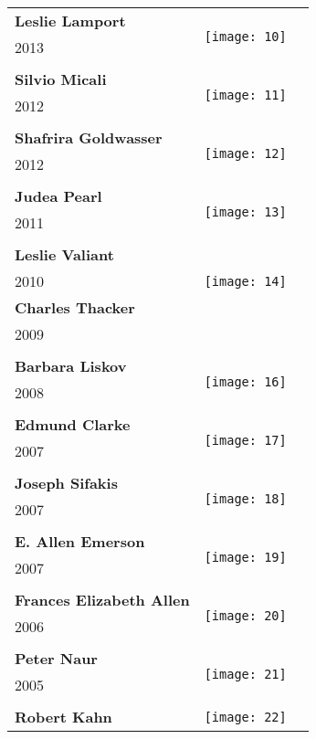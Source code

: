 \documentclass[12pt]{article}
\begin{document}
\begin{center}
\begin{longtable}{| p{} | p{} | p{20cm}}
\hline
\textbf{Leslie Lamport } &  \multirow{3}{4em}{\texttt{[image: 10]}} \\ 
2013&   \\ 
&\\
\hline
\textbf{Silvio Micali } &  \multirow{3}{4em}{\texttt{[image: 11]}} \\ 
2012&   \\ 
&\\
\hline
\textbf{Shafrira Goldwasser } &  \multirow{3}{4em}{\texttt{[image: 12]}} \\ 
2012&   \\ 
&\\
\hline
\textbf{Judea Pearl } &  \multirow{3}{4em}{\texttt{[image: 13]}} \\ 
2011&   \\ 
&\\
\hline
\textbf{Leslie Valiant}  &  \multirow{3}{4em}{\texttt{[image: 14]}} \\ 
2010&   \\ 
\hline
\textbf{Charles Thacker}  &  \multirow{3}{4em}{\texttt{[image: 15]}} \\ 
2009&   \\
&\\
\hline
\textbf{Barbara Liskov } &  \multirow{3}{4em}{\texttt{[image: 16]}} \\ 
2008&   \\ 
&\\
\hline
\textbf{Edmund Clarke}  &  \multirow{3}{4em}{\texttt{[image: 17]}} \\ 
2007&   \\ 
&\\
\hline
\textbf{Joseph Sifakis}  &  \multirow{3}{4em}{\texttt{[image: 18]}} \\ 
2007&   \\ 
&\\
\hline
\textbf{E. Allen Emerson}  &  \multirow{3}{4em}{\texttt{[image: 19]}} \\ 
2007&   \\ 
&\\
\hline
\textbf{Frances Elizabeth Allen}  &  \multirow{3}{4em}{\texttt{[image: 20]}} \\ 
2006&   \\
&\\
\hline
\textbf{Peter Naur } &  \multirow{3}{4em}{\texttt{[image: 21]}} \\ 
2005&   \\ 
&\\
\hline
\textbf{Robert Kahn}  &  \multirow{3}{4em}{\texttt{[image: 22]}} \\ 

\end{longtable}
\end{center}
\end{document}

